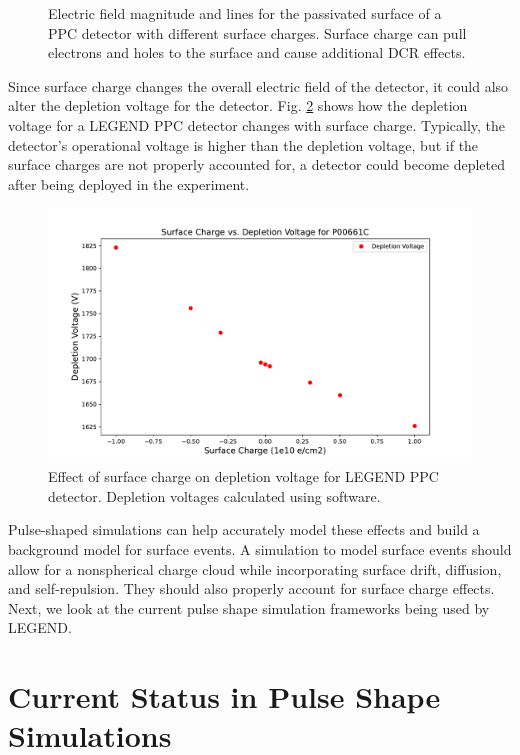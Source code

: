 \begin{figure}
\caption{Electric field magnitude and lines for the passivated surface of a PPC detector with different surface charges. Surface charge can pull electrons and holes to the surface and cause additional DCR effects.}
\label{ch3_fig_surface_field_sc0}
\end{figure}


Since surface charge changes the overall electric field of the detector, it could also alter the depletion voltage for the detector. Fig. \ref{ch3_fig_deplection_sc} shows how the depletion voltage for a LEGEND PPC detector changes with surface charge. Typically, the detector's operational voltage is higher than the depletion voltage, but if the surface charges are not properly accounted for, a detector could become depleted after being deployed in the experiment.

\begin{figure}[!htb]
\centering
  \includegraphics[width=0.99\linewidth]{ch3/figs/deplep_sc.pdf}
 \caption{Effect of surface charge on depletion voltage for LEGEND PPC detector. Depletion voltages calculated using {\siggen} software.}
\label{ch3_fig_deplection_sc}
  \end{figure}

Pulse-shaped simulations can help accurately model these effects and build a background model for surface events. A simulation to model surface events should allow for a nonspherical charge cloud while incorporating surface drift, diffusion, and self-repulsion. They should also properly account for surface charge effects. Next, we look at the current pulse shape simulation frameworks being used by LEGEND.

\section{Current Status in Pulse Shape Simulations}

